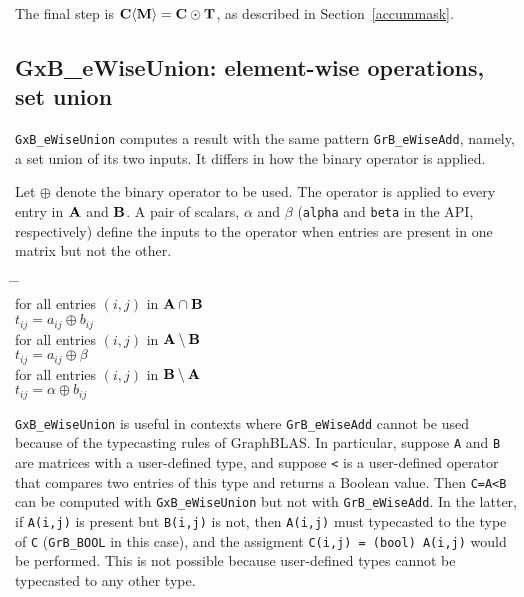 \documentclass[12pt]{article}
\begin{document}
{The final step is ${\bf C \langle M \rangle  = C \odot T}$, as described in
Section~\ref{accummask}.

\newpage
\subsection{{\sf GxB\_eWiseUnion:} element-wise operations, set union} %
\label{eWiseUnion}

\verb'GxB_eWiseUnion' computes a result with the same pattern
\verb'GrB_eWiseAdd', namely, a set union of its two inputs.  It differs in how
the binary operator is applied.

Let $\oplus$ denote the binary operator to be used.  The operator is applied to
every entry in $\bf A$ and $\bf B$.  A pair of scalars, $\alpha$ and $\beta$
(\verb'alpha' and \verb'beta' in the API, respectively) define the
inputs to the operator when entries are present in one matrix but not the
other.

    \vspace{-0.2in}
    {\small
    \begin{tabbing}
    \hspace{2em} \= \hspace{2em} \= \hspace{2em} \= \\
    \> for all entries $(i,j)$ in ${\bf A \cap B}$ \\
    \> \> $t_{ij} = a_{ij} \oplus b_{ij}$ \\
    \> for all entries $(i,j)$ in ${\bf A \setminus B}$ \\
    \> \> $t_{ij} = a_{ij} \oplus \beta $ \\
    \> for all entries $(i,j)$ in ${\bf B \setminus A}$ \\
    \> \> $t_{ij} = \alpha \oplus b_{ij}$
    \end{tabbing}
    }

\verb'GxB_eWiseUnion' is useful in contexts where \verb'GrB_eWiseAdd' cannot be
used because of the typecasting rules of GraphBLAS.  In particular, suppose
\verb'A' and \verb'B' are matrices with a user-defined type, and suppose
\verb'<' is a user-defined operator that compares two entries of this type and
returns a Boolean value.  Then \verb'C=A<B' can be computed with
\verb'GxB_eWiseUnion' but not with \verb'GrB_eWiseAdd'.  In the latter, if
\verb'A(i,j)' is present but \verb'B(i,j)' is not, then \verb'A(i,j)' must
typecasted to the type of \verb'C' (\verb'GrB_BOOL' in this case), and the
assigment \verb'C(i,j) = (bool) A(i,j)' would be performed.  This is not
possible because user-defined types cannot be typecasted to any other type.

}
\end{document}
